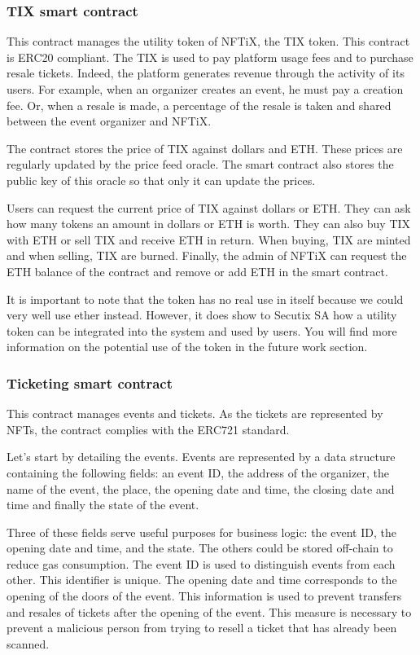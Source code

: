 \documentclass[a4paper,11pt,oneside]{report}
\begin{document}
\subsubsection{TIX smart contract}
This contract manages the utility token of NFTiX, the TIX token. This contract is ERC20 compliant. The TIX is used to pay platform usage fees and to purchase resale tickets. Indeed, the platform generates revenue through the activity of its users. For example, when an organizer creates an event, he must pay a creation fee. Or, when a resale is made, a percentage of the resale is taken and shared between the event organizer and NFTiX.

The contract stores the price of TIX against dollars and ETH. These prices are regularly updated by the price feed oracle. The smart contract also stores the public key of this oracle so that only it can update the prices.

Users can request the current price of TIX against dollars or ETH. They can ask how many tokens an amount in dollars or ETH is worth. They can also buy TIX with ETH or sell TIX and receive ETH in return. When buying, TIX are minted and when selling, TIX are burned. Finally, the admin of NFTiX can request the ETH balance of the contract and remove or add ETH in the smart contract.

It is important to note that the token has no real use in itself because we could very well use ether instead. However, it does show to Secutix SA how a utility token can be integrated into the system and used by users. You will find more information on the potential use of the token in the future work section.

\subsubsection{Ticketing smart contract}
This contract manages events and tickets. As the tickets are represented by NFTs, the contract complies with the ERC721 standard.

Let's start by detailing the events. Events are represented by a data structure containing the following fields: an event ID, the address of the organizer, the name of the event, the place, the opening date and time, the closing date and time and finally the state of the event. 

Three of these fields serve useful purposes for business logic: the event ID, the opening date and time, and the state. The others could be stored off-chain to reduce gas consumption. The event ID is used to distinguish events from each other. This identifier is unique. The opening date and time corresponds to the opening of the doors of the event. This information is used to prevent transfers and resales of tickets after the opening of the event. This measure is necessary to prevent a malicious person from trying to resell a ticket that has already been scanned.
\end{document}
